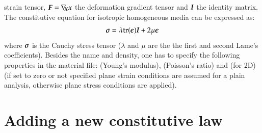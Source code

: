 strain tensor, $\boldsymbol{F} = \nabla_{\!\!\boldsymbol{X}}\boldsymbol{x}$ the deformation
gradient tensor and $\boldsymbol{I}$ the identity matrix. The constitutive
equation for isotropic homogeneous media can be expressed as:
\begin{equation}
\label{eqn:smm:material:constitutive_elastic}
\boldsymbol{\sigma } =\lambda\mathrm{tr}(\boldsymbol{\epsilon})\boldsymbol{I}+2 \mu
\boldsymbol{\epsilon}
\end{equation} where $\boldsymbol{\sigma}$ is the Cauchy stress tensor
($\lambda$ and $\mu$ are the the first and second Lame's
coefficients). Besides the name and density, one has to specify the
following properties in the material file:  (Young's modulus),
 (Poisson's ratio) and (for 2D)  (if set
to zero or not specified plane strain conditions are assumed for a
plain analysis, otherwise plane stress conditions are applied).




\section{Adding a new constitutive law}

